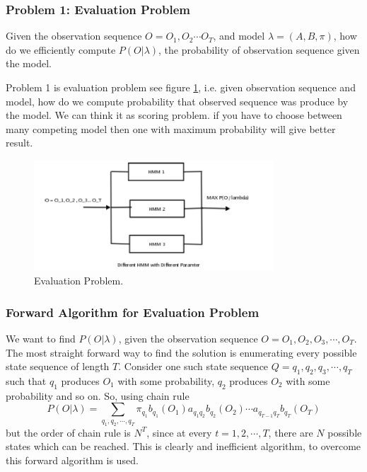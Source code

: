 \documentclass[12pt, a4paper, twoside]{report}
\begin{document}
\subsubsection{Problem 1: Evaluation Problem}
Given the observation sequence $O = O_1, O_2 \cdots O_T$, and model $\lambda = (A, B, \pi)$, how do we efficiently compute $P(O| \lambda)$, the probability of observation sequence given the model.
\par
Problem 1 is evaluation problem see figure \ref{fig:eval-prob}, i.e. given observation sequence and model, how do we compute probability that observed sequence was produce by the model. We can think it as scoring problem. if you have to choose between many competing model then one with maximum probability will give better result. 
\begin{figure}[!h]
	\centering
	\includegraphics[width=0.8\textwidth]
	{images/chapter4/eval-prob}
	\caption{Evaluation Problem.}
	\label{fig:eval-prob}
\end{figure}

\subsubsection{Forward Algorithm for Evaluation Problem}
We want to find $P(O|\lambda)$, given the observation sequence $O = O_1, O_2, O_3, \cdots, O_T$. The most straight forward way to find the solution is enumerating every possible state sequence of length $T$. Consider one such state sequence $Q = q_1, q_2, q_3, \cdots, q_T$ such that $q_1$ produces $O_1$ with some probability, $q_2$ produces $O_2$ with some probability and so on. So, using chain rule
\begin{equation}
P(O|\lambda) = \sum_{q_1,q_2,\cdots,q_T} \pi_{q_1} b_{q_1}(O_1) a_{q_1 q_2} b_{q_2}(O_2) \cdots a_{q_{T-1} q_T} b_{q_T}(O_T)
\end{equation}
but the order of chain rule is $N^T$, since at every $t = 1, 2, \cdots , T$, there are $N$ possible states which can be reached. This is clearly and inefficient algorithm, to overcome this forward algorithm is used.
\end{document}

